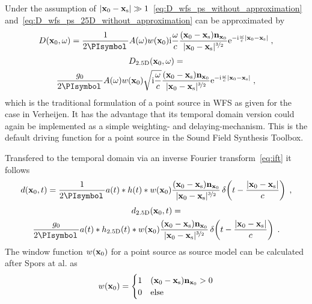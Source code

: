 %
Under the assumption of $|\mathbf{x}_0-\mathbf{x}_\text{s}| \gg
1$~\eqref{eq:D_wfs_ps_without_approximation}
and~\eqref{eq:D_wfs_ps_25D_without_approximation} can be approximated by
%
\begin{equation}
    D(\x_0,\omega) = \frac{1}{2\PI} A(\omega) w(\x_0) \I\omegac
    \frac{(\x_0-\xs)\n_{\x_0}}{|\x_0-\xs|^{\nicefrac{3}{2}}}
    \E^{-\I\omegac |\x_0-\xs|} \qc
    \label{eq:D_wfs_ps}
\end{equation}
%
\begin{multline}
    D_\twohalfD(\x_0,\omega) = \\
    \frac{g_0}{2\PI} A(\omega) w(\x_0) \sqrt{\I\omegac}
    \frac{(\x_0-\xs)\n_{\x_0}}{|\x_0-\xs|^{\nicefrac{3}{2}}}
    \E^{-\I\omegac |\x_0-\xs|} \qc
    \label{eq:D_wfs_ps_25D}
\end{multline}
%
which is the traditional formulation of a point source in
\ac{WFS} as given for the \twohalfD case in
Verheijen.\autocite[][(2.22a), whereby $r$ corresponds to $|\x_0-\xs|$ and
$\cos\varphi$ to $\frac{(\x_0-\xs)\n_{\x_0}}{|\x_0-\xs|}$]{Verheijen1997}
It has the advantage that its temporal domain version could again be implemented as
a simple weighting- and delaying-mechanism.
This is the default driving function for a point source in the Sound Field
Synthesis Toolbox.

Transfered to the temporal domain via an inverse Fourier transform~\eqref{eq:ift} it follows
%
\begin{equation}
    d(\x_0,t) = \frac{1}{2\PI} a(t) * h(t) * w(\x_0)
    \frac{(\x_0-\xs)\n_{\x_0}}{|\x_0-\xs|^{\nicefrac{3}{2}}}
    \deltafunc{t-\frac{|\x_0-\xs|}{c}} \qc
    \label{eq:d_wfs_ps}
\end{equation}
%
\begin{multline}
    d_\twohalfD(\x_0,t) = \\
    \frac{g_0}{2\PI} a(t) * h_\twohalfD(t) * w(\x_0)
    \frac{(\x_0-\xs)\n_{\x_0}}{|\x_0-\xs|^{\nicefrac{3}{2}}}
    \deltafunc{t-\frac{|\x_0-\xs|}{c}} \qp
    \label{eq:d_wfs_ps_25D}
\end{multline}
%
The window function $w(\mathbf{x}_0)$ for a point source as source model can be
calculated after Spors at al. as\autocite{Spors2008}
%
\begin{equation}
    w(\x_0) = 
    \begin{cases}
        1 & (\x_0-\xs) \n_{\x_0} > 0 \\
        0 & \text{else}
    \end{cases}
    \label{eq:w_ps}
\end{equation}
%


